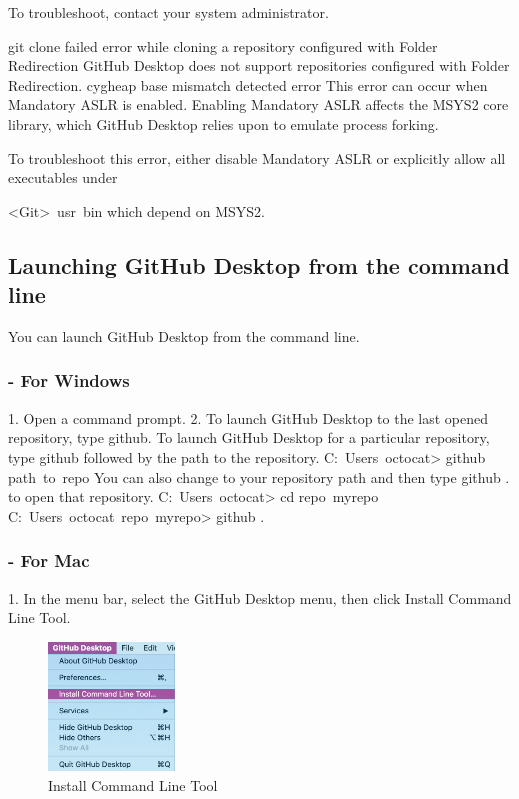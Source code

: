 To troubleshoot, contact your system administrator.

git clone failed error while cloning a repository configured with Folder Redirection
GitHub Desktop does not support repositories configured with Folder Redirection.
cygheap base mismatch detected error
This error can occur when Mandatory ASLR is enabled. Enabling Mandatory ASLR affects the MSYS2 core library, which GitHub Desktop relies upon to emulate process forking.

To troubleshoot this error, either disable Mandatory ASLR or explicitly allow all executables under

<Git>\ usr\ bin which depend on MSYS2.



\subsection{ Launching GitHub Desktop from the command line}

You can launch GitHub Desktop from the command line.

\subsubsection{- For Windows }

1.	Open a command prompt.
2.	To launch GitHub Desktop to the last opened repository, type github. To launch GitHub Desktop for a particular repository, type github followed by the path to the repository.
C:\ Users\ octocat> github path\ to\ repo
You can also change to your repository path and then type github . to open that repository.
C:\ Users\ octocat> cd repo\ myrepo
 C:\ Users\ octocat\ repo\ myrepo> github .
  
 \subsubsection{- For Mac }
1.	In the menu bar, select the GitHub Desktop menu, then click Install Command Line Tool.

\begin{figure}[ht]
    \centering
    \includegraphics[width=0.3\textwidth]{figures/Install Command Line Tool.png}
    \caption{Install Command Line Tool}
\end{figure}


